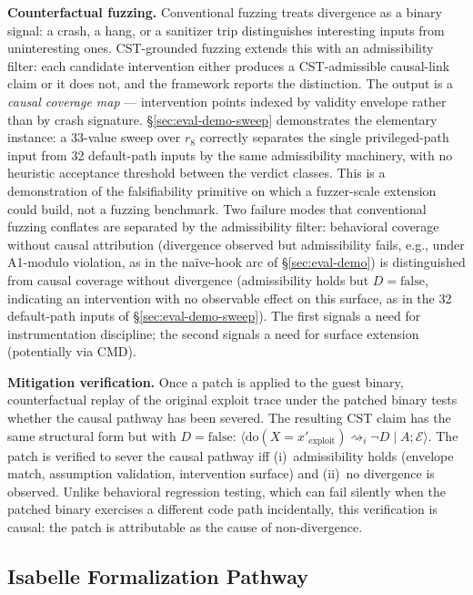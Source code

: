 \documentclass[conference]{IEEEtran}
\begin{document}
\textbf{Counterfactual fuzzing.} Conventional fuzzing treats
divergence as a binary signal: a crash, a hang, or a sanitizer
trip distinguishes interesting inputs from uninteresting ones.
CST-grounded fuzzing extends this with an admissibility filter:
each candidate intervention either produces a CST-admissible
causal-link claim or it does not, and the framework reports the
distinction. The output is a \emph{causal coverage map} ---
intervention points indexed by validity envelope rather than by
crash signature. \S\ref{sec:eval-demo-sweep} demonstrates the
elementary instance: a 33-value sweep over $r_8$ correctly
separates the single privileged-path input from 32 default-path
inputs by the same admissibility machinery, with no heuristic
acceptance threshold between the verdict classes. This is a
demonstration of the falsifiability primitive on which a
fuzzer-scale extension could build, not a fuzzing benchmark.
Two failure modes that conventional fuzzing conflates are
separated by the admissibility filter: behavioral coverage
without causal attribution (divergence observed but admissibility
fails, e.g., under A1-modulo violation, as in the naïve-hook
arc of \S\ref{sec:eval-demo}) is distinguished from causal
coverage without divergence (admissibility holds but
$D = \text{false}$, indicating an intervention with no observable
effect on this surface, as in the 32 default-path inputs of
\S\ref{sec:eval-demo-sweep}). The first signals a need for
instrumentation discipline; the second signals a need for
surface extension (potentially via CMD).

\textbf{Mitigation verification.} Once a patch is applied to the
guest binary, counterfactual replay of the original exploit trace
under the patched binary tests whether the causal pathway has
been severed. The resulting CST claim has the same structural
form but with $D = \text{false}$:
$\langle \text{do}(X{=}x'_\text{exploit}) \rightsquigarrow_i \neg D
\mid A; \mathcal{E}\rangle$. The patch is verified to sever the
causal pathway iff (i)~admissibility holds (envelope match,
assumption validation, intervention surface) and (ii)~no divergence
is observed. Unlike behavioral regression testing, which can fail
silently when the patched binary exercises a different code path
incidentally, this verification is causal: the patch is
attributable as the cause of non-divergence.

\subsection{Isabelle Formalization Pathway}\label{sec:discussion-isabelle}
\end{document}
